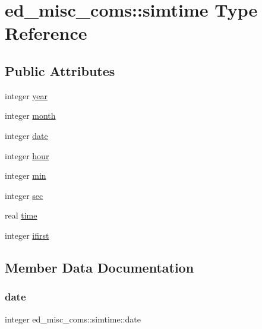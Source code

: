 \hypertarget{structed__misc__coms_1_1simtime}{}\section{ed\+\_\+misc\+\_\+coms\+:\+:simtime Type Reference}
\label{structed__misc__coms_1_1simtime}
\subsection*{Public Attributes}
\begin{DoxyCompactItemize}
\item 
integer \hyperlink{structed__misc__coms_1_1simtime_aa33c38e2a4be886fb46a0b41fc3614a9}{year}
\item 
integer \hyperlink{structed__misc__coms_1_1simtime_ab86b304a048841744f882f3d246b16b4}{month}
\item 
integer \hyperlink{structed__misc__coms_1_1simtime_a59815290d08ac367aeba85374f9fd29e}{date}
\item 
integer \hyperlink{structed__misc__coms_1_1simtime_a29ae7a915202b4505663d98424170644}{hour}
\item 
integer \hyperlink{structed__misc__coms_1_1simtime_aa6712664d87da86087d97814e6e6ac18}{min}
\item 
integer \hyperlink{structed__misc__coms_1_1simtime_ae8e8980c611067383ea98b345220a9ad}{sec}
\item 
real \hyperlink{structed__misc__coms_1_1simtime_af1edf430fdbca01a520e8d813d6f769a}{time}
\item 
integer \hyperlink{structed__misc__coms_1_1simtime_a41401a549e7e7e0b641ca1ee0e1e4664}{ifirst}
\end{DoxyCompactItemize}


\subsection{Member Data Documentation}
\mbox{\label{structed__misc__coms_1_1simtime_a59815290d08ac367aeba85374f9fd29e}} 
\subsubsection{\texorpdfstring{date}{date}}
{\footnotesize\ttfamily integer ed\+\_\+misc\+\_\+coms\+::simtime\+::date}

